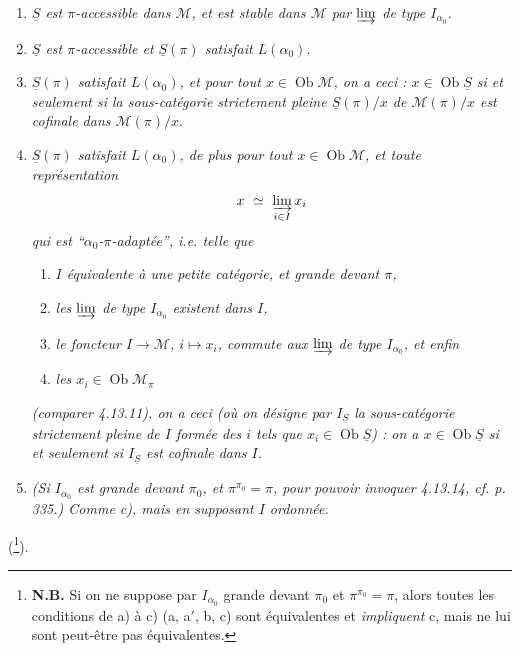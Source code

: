 \documentclass[11pt]{article}
\newcommand{\msp}[1]{\marginpar{\footnotesize [#1]}}
\DeclareMathOperator{\Ob}{Ob}
\begin{document}
\begin{enumerate}[label={}]
\item[\textit{a)}] \textit{$\underline{S}$ est $\pi$-accessible dans $\mathcal{M}$, et est stable dans $\mathcal{M}$ par $\varinjlim$ de type $I_{\alpha_0}$.}
\item[\textit{a$'$)}] \textit{$\underline{S}$ est $\pi$-accessible et $\underline{S}(\pi)$ satisfait $L(\alpha_0)$.}
\item[\textit{b)}] \textit{$\underline{S}(\pi)$ satisfait $L(\alpha_0)$, et pour tout $x \in \Ob\mathcal{M}$, on a ceci : $x \in \Ob\underline{S}$ si et seulement si la sous-catégorie strictement pleine $\underline{S}(\pi)/x$ de $\mathcal{M}(\pi)/x$ est cofinale dans $\mathcal{M}(\pi)/x$}.
\item[\textit{c)}] \textit{$\underline{S}(\pi)$ satisfait $L(\alpha_0)$, de plus pour tout $x \in \Ob\mathcal{M}$, et toute représentation}
\[
x \ \simeq \ \varinjlim_{i\in I} x_i
\]
\msp{page 339}
\textit{qui est ``$\alpha_0$-$\pi$-adaptée'', i.e. telle que}
\begin{enumerate}[label={}]
\item[\textit{$1^\circ$)}] \textit{$I$ équivalente à une petite catégorie, et grande devant $\pi$,}
\item[\textit{$2^\circ$)}] \textit{les $\varinjlim$ de type $I_{\alpha_0}$ existent dans $I$,}
\item[\textit{$3^\circ$)}] \textit{le foncteur $I \longrightarrow \mathcal{M}$, $i \longmapsto x_i$, commute aux $\varinjlim$ de type $I_{\alpha_0}$, et enfin}
\item[\textit{$4^\circ$)}] \textit{les $x_i \in \Ob\mathcal{M}_\pi$}
\end{enumerate}
\textit{(comparer 4.13.11), on a ceci (où on désigne par $I_{\underline{S}}$ la sous-catégorie strictement pleine de $I$ formée des $i$ tels que $x_i \in \Ob\underline{S}$) : on a $x \in \Ob\underline{S}$ si et seulement si $I_{\underline{S}}$ est cofinale dans $I$.}
\item[\textit{c$'$)}] \textit{(\textup{Si} $I_{\alpha_0}$ est grande devant $\pi_0$, et $\pi^{\pi_0} = \pi$, pour pouvoir invoquer 4.13.14, cf. p. 335.) Comme c), mais en supposant $I$ ordonnée.}
\end{enumerate}
(\footnote[143]{\textbf{N.B.} Si on ne suppose par $I_{\alpha_0}$ grande devant $\pi_0$ et %
$\pi^{\pi_0} = \pi$, alors toutes les conditions de a) à c) (a, a$'$, b, c) sont équivalentes et \textit{impliquent} c, mais ne lui sont peut-être pas équivalentes.}).
\end{document}
